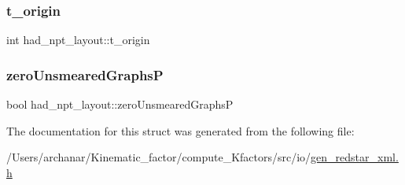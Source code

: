 \subsubsection{\texorpdfstring{t\_origin}{t\_origin}}
{\footnotesize\ttfamily int had\+\_\+npt\+\_\+layout\+::t\+\_\+origin}

\mbox{\label{structhad__npt__layout_a7ff641e8e1a526af94a8a1cadcff2f55}} 
\subsubsection{\texorpdfstring{zeroUnsmearedGraphsP}{zeroUnsmearedGraphsP}}
{\footnotesize\ttfamily bool had\+\_\+npt\+\_\+layout\+::zero\+Unsmeared\+GraphsP}



The documentation for this struct was generated from the following file\+:\begin{DoxyCompactItemize}
\item 
/\+Users/archanar/\+Kinematic\+\_\+factor/compute\+\_\+\+Kfactors/src/io/\mbox{\hyperlink{gen__redstar__xml_8h}{gen\+\_\+redstar\+\_\+xml.\+h}}\end{DoxyCompactItemize}
